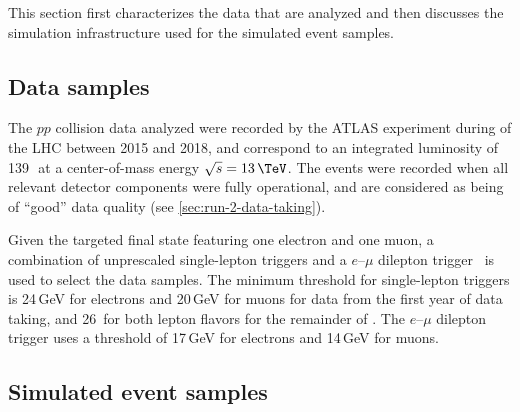 %


\newcommand{\quotebox}[1]{
\begin{mdframed}[backgroundcolor=blue!6!gray!6,rightline=false,leftline=false,topline=false,bottomline=false]
{\LARGE``}{#1}{{\LARGE''}}~\cite{HWWPaper}
\end{mdframed}
}

This section first characterizes the data that are analyzed and then discusses the simulation infrastructure used for the simulated event samples.

\subsection{Data samples}
\label{subsec:data-samples}
The $pp$ collision data analyzed were recorded by the ATLAS experiment during \RunTwo of the LHC between 2015 and 2018, and correspond to an integrated luminosity of 139\,\ifb\ at a center-of-mass energy $\sqrt{s} = 13\,\TeV$.
The events were recorded when all relevant detector components were fully operational, and are considered as being of ``good'' data quality (see \cref{sec:run-2-data-taking}).

Given the targeted final state featuring one electron and one muon, a combination of unprescaled single-lepton triggers and a $e$--$\mu$ dilepton trigger~\cite{TRIG-2018-05,TRIG-2018-01} is used to select the data samples.
The minimum \pT threshold for single-lepton triggers is 24\,GeV for electrons and 20\,GeV for muons for data from the first year of data taking, and 26~\GeV for both lepton flavors for the remainder of \RunTwo.
The $e$--$\mu$ dilepton trigger uses a \pT threshold of 17\,GeV for electrons and 14\,GeV for muons.

\subsection{Simulated event samples}
\label{subsec:simulated-event-samples}

